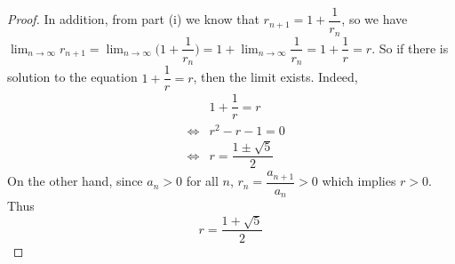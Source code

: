 \documentclass[10pt,letterpaper]{article}
\begin{document}
\begin{enumerate}[(i)]
\begin{proof}
		In addition, from part (i) we know that $r_{n+1} = 1 + \dfrac{1}{r_n}$, so we have
		$\displaystyle\lim_{n\to\infty} r_{n+1} = \displaystyle\lim_{n\to\infty}
		\bigg(1 + \dfrac{1}{r_n}\bigg) = 1 + \displaystyle\lim_{n\to\infty}\dfrac{1}{r_n} = 
		1 + \dfrac{1}{r} = r$. So if there is solution to the equation $1 + \dfrac{1}{r} = r$, then
		the limit exists. Indeed,
		\begin{eqnarray*}
			& & 1 + \dfrac{1}{r} = r \\
			&\Leftrightarrow & r^2 - r - 1 = 0 \\
			&\Leftrightarrow & r = \dfrac{1 \pm \sqrt{5}}{2}
		\end{eqnarray*}
		On the other hand, since $a_{n} > 0$ for all $n$, $r_n = \dfrac{a_{n+1}}{a_{n}} > 0$
		which implies $r > 0$. Thus
		$$r = \dfrac{1 + \sqrt{5}}{2}$$	
		\end{proof}
	\end{enumerate}		
	
	
	
	
	
\end{document}
